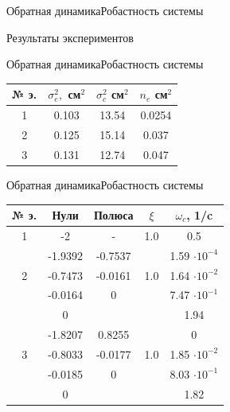 \begin{frame}{Обратная динамика}{Робастность системы}
    \begin{block}{Результаты экспериментов}
    \end{block}
\end{frame}

\begin{frame}{Обратная динамика}{Робастность системы}

\begin{table}[H]
    \begin{tabular}{|c|c|c|c|}
        \hline 
        № э.& $\sigma^2_e,$ см$^2$ & $\sigma^2_c$ см$^2$ & $n_e$ см$^2$ \\ \hline 
        1& 0.103 & 13.54 & 0.0254\\ \hline
        2& 0.125 & 15.14  & 0.037 \\ \hline
        3& 0.131 & 12.74 & 0.047\\ \hline

    \end{tabular}
\end{table}
\end{frame}
 
\begin{frame}{Обратная динамика}{Робастность системы}
\begin{table}[H]
    \begin{tabular}{|c|c|c|c|c|}
        \hline 
        № э.&Нули & Полюса & $\xi$ & $\omega_c$, 1/c \\ \hline 
        1& -2 & - & 1.0 &0.5 \\ \hline
        & -1.9392 & -0.7537  &  & 1.59 $\cdot 10^{-4}$\\ 
        2& -0.7473 & -0.0161  &1.0 & 1.64 $\cdot 10^{-2}$\\ 
        & -0.0164 &  0 & &7.47 $\cdot 10^{-1}$\\ 
        & 0 &   &  &1.94 \\ \hline 
        & -1.8207 & 0.8255 & &0\\ 
        3& -0.8033 & -0.0177 & 1.0&1.85 $\cdot 10^{-2}$\\ 
        & -0.0185 & 0 & &8.03 $\cdot 10^{-1}$ \\ 
        & 0 &  &  &1.82 \\ \hline
    \end{tabular}
\end{table}

\end{frame}

